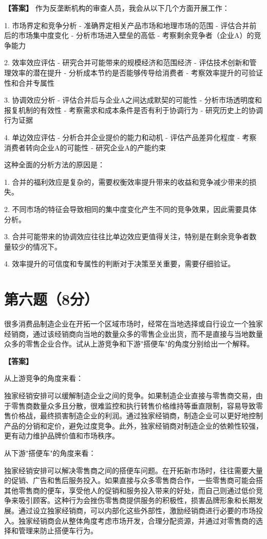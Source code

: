 \documentclass[12pt]{article}
\begin{document}
\noindent\textbf{【答案】}
作为反垄断机构的审查人员，我会从以下几个方面开展工作：

1. 市场界定和竞争分析
   - 准确界定相关产品市场和地理市场的范围
   - 评估合并前后的市场集中度变化
   - 分析市场进入壁垒的高低
   - 考察剩余竞争者（企业A）的竞争能力

2. 效率效应评估
   - 研究合并可能带来的规模经济和范围经济
   - 评估技术创新和管理效率的潜在提升
   - 分析成本节约是否能够传导给消费者
   - 考察效率提升的可验证性和合并专属性

3. 协调效应分析
   - 评估合并后与企业A之间达成默契的可能性
   - 分析市场透明度和报复机制的有效性
   - 考察需求和成本条件是否有利于协调行为
   - 研究历史上的协调行为证据

4. 单边效应评估
   - 分析合并企业提价的能力和动机
   - 评估产品差异化程度
   - 考察消费者转向企业A的可能性
   - 研究企业A的产能约束

这种全面的分析方法的原因是：

1. 合并的福利效应是复杂的，需要权衡效率提升带来的收益和竞争减少带来的损失。

2. 不同市场的特征会导致相同的集中度变化产生不同的竞争效果，因此需要具体分析。

3. 合并可能带来的协调效应往往比单边效应更值得关注，特别是在剩余竞争者数量较少的情况下。

4. 效率提升的可信度和专属性的判断对于决策至关重要，需要仔细验证。

\section*{第六题（8分）}
很多消费品制造企业在开拓一个区域市场时，经常在当地选择或自行设立一个独家经销商，通过该经销商向当地的数量众多的零售企业出货，而不是直接与当地数量众多的零售企业合作。试从上游竞争和下游"搭便车"的角度分别给出一个解释。

\noindent\textbf{【答案】}

从上游竞争的角度来看：

独家经销安排可以缓解制造企业之间的竞争。如果制造企业直接与零售商交易，由于零售商数量众多且分散，很难监控和执行转售价格维持等垂直限制，容易导致零售价格战，最终损害制造企业的利润。通过独家经销商，制造企业可以更好地控制产品的分销和定价，避免过度竞争。此外，独家经销商对制造企业的依赖性较强，更有动力维护品牌价值和市场秩序。

从下游"搭便车"的角度来看：

独家经销安排可以解决零售商之间的搭便车问题。在开拓新市场时，往往需要大量的促销、广告和售后服务投入。如果直接与众多零售商合作，一些零售商可能会搭其他零售商的便车，享受他人的促销和服务投入带来的好处，而自己则通过低价竞争来吸引顾客。这种行为会挫伤零售商提供服务的积极性，损害品牌形象和长期发展。通过设立独家经销商，可以内部化这些外部性，激励经销商进行必要的市场投入。独家经销商会从整体角度考虑市场开发，合理分配资源，并通过对零售商的选择和管理来防止搭便车行为。
\end{document}
